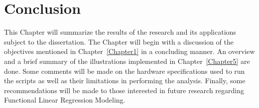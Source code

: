 
\chapter{Conclusion} %

\label{Chapter6} %




This Chapter will summarize the results of the research and its applications  subject to the dissertation. The Chapter will begin with a discussion of the objectives mentioned in Chapter~\ref{Chapter1} in a concluding manner. An overview and a brief summary of the illustrations implemented in Chapter~\ref{Chapter5} are done. Some comments will be made on the hardware specifications used to run the scripts as well as their limitations in performing the analysis. Finally, some recommendations will be made to those interested in future research regarding Functional Linear Regression Modeling.



